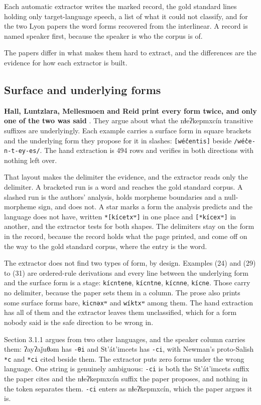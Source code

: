 Each automatic extractor writes the marked record, the gold standard lines holding only target-language speech, a list of what it could not classify, and for the two Lyon papers the word forms recovered from the interlinear. A record is named speaker first, because the speaker is who the corpus is of.

The papers differ in what makes them hard to extract, and the differences are the evidence for how each extractor is built.

\subsection{Surface and underlying forms}

\textbf{Hall, Luntzlara, Mellesmoen and Reid print every form twice, and only one of the two was said} \cite{src:Hall-Luntzlara-Mellesmoen-and-Reid-2026}. They argue about what the nɬeʔkepmxcín transitive suffixes are underlyingly. Each example carries a surface form in square brackets and the underlying form they propose for it in slashes: \texttt{[wéc̓entis]} beside \texttt{/wéc̓e-n-t-ey-es/}. The hand extraction is 494 rows and verifies in both directions with nothing left over.

That layout makes the delimiter the evidence, and the extractor reads only the delimiter. A bracketed run is a word and reaches the gold standard corpus. A slashed run is the authors' analysis, holds morpheme boundaries and a null-morpheme sign, and does not. A star marks a form the analysis predicts and the language does not have, written \texttt{*[kícetxʷ]} in one place and \texttt{[*kícexʷ]} in another, and the extractor tests for both shapes. The delimiters stay on the form in the record, because the record holds what the page printed, and come off on the way to the gold standard corpus, where the entry is the word.

The extractor does not find two types of form, by design. Examples (24) and (29) to (31) are ordered-rule derivations and every line between the underlying form and the surface form is a stage: \texttt{kícntene}, \texttt{kícntne}, \texttt{kícnne}, \texttt{kícne}. Those carry no delimiter, because the paper sets them in a column. The prose also prints some surface forms bare, \texttt{kicnəxʷ} and \texttt{wíktxʷ} among them. The hand extraction has all of them and the extractor leaves them unclassified, which for a form nobody said is the safe direction to be wrong in.

Section 3.1.1 argues from two other languages, and the speaker column carries them: ʔayʔaǰuθəm has \texttt{-θi} and St'át'imcets has \texttt{-ci}, with Newman's proto-Salish \texttt{*c} and \texttt{*ci} cited beside them. The extractor puts zero forms under the wrong language. One string is genuinely ambiguous: \texttt{-ci} is both the St'át'imcets suffix the paper cites and the nɬeʔkepmxcín suffix the paper proposes, and nothing in the token separates them. \texttt{-ci} enters as nɬeʔkepmxcín, which the paper argues it is.

